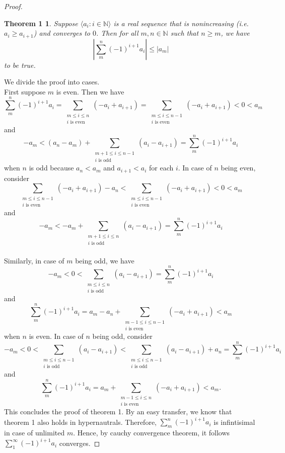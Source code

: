 \documentclass[a4paper, 11pt]{book}
\theoremstyle{plain}
\newtheorem*{theorem1}{Theorem 1}
\theoremstyle{plain}
\newcommand{\N}{\mathbb{N}}
\newcommand{\la}{\langle}
\newcommand{\ra}{\rangle}
\begin{document}
\begin{proof}
    \begin{theorem1}
      Suppose $\la a_i: i \in \N \ra$ is a real sequence that is nonincreasing (i.e. $a_i \geq a_{i+1}$) and converges to $0$. Then for all $m,n \in \N$ such that $n\geq m$, we have $$\left| \sum_{m}^n (-1)^{i+1} a_i \right| \leq |a_m|$$ to be true.
    \end{theorem1}
    We divide the proof into  cases. \\
    First suppose $m$ is even. Then we have $$ \sum_{m}^n (-1)^{i+1} a_i=\sum_{\substack{m \leq i \leq n \\ i \text{ is even }}} (-a_i+a_{i+1})=\sum_{\substack{m \leq i \leq n-1  \\ i \text{ is even }}} (-a_i+a_{i+1})<0 <a_m$$ and $$-a_m<(a_n - a_m)+ \sum_{\substack{m+1 \leq i \leq n-1  \\ i \text{ is odd }}} (a_i-a_{i+1})=\sum_{m}^n (-1)^{i+1} a_i$$ when $n$ is odd because $a_n<a_m$ and $a_{i+1}<a_i$ for each $i$. In case of $n$ being even, consider $$\sum_{\substack{m \leq i \leq n-1  \\ i \text{ is even }}} (-a_i+a_{i+1})-a_n<\sum_{\substack{m \leq i \leq n-1  \\ i \text{ is even }}} (-a_i+a_{i+1})<0<a_m$$ and $$-a_m<- a_m+ \sum_{\substack{m+1 \leq i \leq n  \\ i \text{ is odd }}} (a_i-a_{i+1})=\sum_{m}^n (-1)^{i+1} a_i$$ \\
    Similarly, in case of $m$ being odd, we have $$-a_m<0< \sum_{\substack{m \leq i \leq n \\ i \text{ is odd}}} (a_i-a_{i+1}) =\sum_{m}^n (-1)^{i+1} a_i$$ and $$\sum_{m}^n (-1)^{i+1} a_i=a_m-a_n+\sum_{\substack{m-1 \leq i \leq n-1 \\ i \text{ is even }}} (-a_i+a_{i+1})<a_m$$ when $n$ is even. In case of $n$ being odd, consider $$-a_m<0<\sum_{\substack{m \leq i \leq n-1 \\ i \text{ is odd}}} (a_i-a_{i+1})<\sum_{\substack{m \leq i \leq n-1 \\ i \text{ is odd}}} (a_i-a_{i+1})+a_n=\sum_{m}^n (-1)^{i+1} a_i$$ and $$\sum_{m}^n (-1)^{i+1} a_i=a_m+\sum_{\substack{m-1 \leq i \leq n \\ i \text{ is even }}} (-a_i+a_{i+1})<a_m. $$ This concludes the proof of theorem 1. By an easy transfer, we know that theorem 1 also holds in hypernautrals. Therefore, $\sum_{m}^n (-1)^{i+1} a_i$ is infintisimal in case of unlimited $m$. Hence, by cauchy convergence theorem, it follows $\sum_{1}^\infty (-1)^{i+1} a_i$ converges.
  \end{proof}
  
\end{document}
